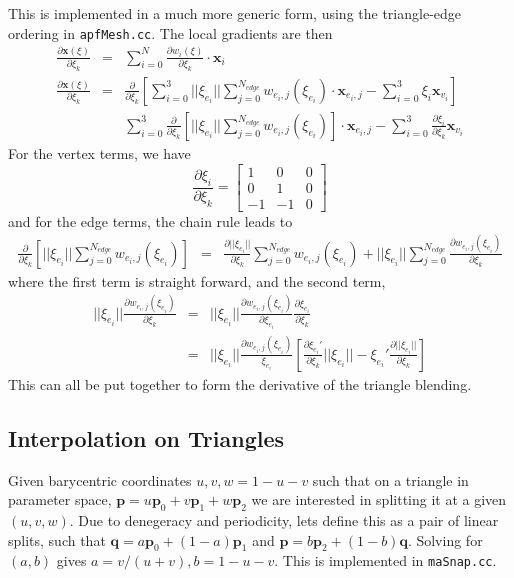 \documentclass{article}
\begin{document}
This is implemented in a much more generic form, using the triangle-edge ordering in \texttt{apfMesh.cc}. The local gradients are then
\begin{eqnarray*}\frac{\partial \mathbf{x}(\xi)}{\partial \xi_k}& = & \sum_{i=0}^N \frac{\partial w_i(\xi)}{\partial \xi_k} \cdot \mathbf{x}_i \\
\frac{\partial \mathbf{x}(\xi)}{\partial \xi_k}& = & \frac{\partial}{\partial \xi_k}\left[\sum_{i=0}^{3}||\xi_{e_i}||\sum_{j=0}^{N_{edge}}w_{e_i,j}(\xi_{e_i})\cdot\mathbf{x}_{e_i,j}- \sum_{i=0}^{3}\xi_i\mathbf{x}_{v_i}\right] \\ & & 
\sum_{i=0}^{3}\frac{\partial}{\partial \xi_k}\left[||\xi_{e_i}||\sum_{j=0}^{N_{edge}}w_{e_i,j}(\xi_{e_i})\right]\cdot\mathbf{x}_{e_i,j}- \sum_{i=0}^{3} \frac{\partial \xi_i}{\partial \xi_k}\mathbf{x}_{v_i}\end{eqnarray*}
For the vertex terms, we have
\[ \frac{\partial \xi_i}{\partial \xi_k} = \left[ \begin{array}{ccc} 1 & 0 & 0 \\ 0 & 1 & 0 \\ -1 & -1 & 0 \end{array}\right]\]
and for the edge terms, the chain rule leads to
\begin{eqnarray*}\frac{\partial}{\partial \xi_k}\left[||\xi_{e_i}||\sum_{j=0}^{N_{edge}}w_{e_i,j}(\xi_{e_i})\right] & = & \frac{\partial ||\xi_{e_i}||}{\partial \xi_k}\sum_{j=0}^{N_{edge}}w_{e_i,j}(\xi_{e_i}) + ||\xi_{e_i}||\sum_{j=0}^{N_{edge}}\frac{\partial w_{e_i,j}(\xi_{e_i})}{\partial \xi_k}

\end{eqnarray*}
where the first term is straight forward, and the second term, 
\begin{eqnarray*}
||\xi_{e_i}||\frac{\partial w_{e_i,j}(\xi_{e_i})}{\partial \xi_k} & = & 
||\xi_{e_i}||\frac{\partial w_{e_i,j}(\xi_{e_i})}{\partial \xi_{e_i}}\frac{\partial \xi_{e_i}}{\partial \xi_k} \\ & = & 
||\xi_{e_i}||\frac{\partial w_{e_i,j}(\xi_{e_i})}{\xi_{e_i}}\left[\frac{\partial \xi_{e_i}'}{\partial \xi_k}||\xi_{e_i}||-\xi_{e_i}'\frac{\partial ||\xi_{e_i}||}{\partial \xi_k} \right]

\end{eqnarray*}
This can all be put together to form the derivative of the triangle blending.



\subsection{Interpolation on Triangles}
Given barycentric coordinates $u,v,w=1-u-v$ such that on a triangle in parameter space, $\mathbf{p} = u\mathbf{p}_0 + v\mathbf{p}_1 + w\mathbf{p}_2$ we are interested in splitting it at a given $(u,v,w)$. Due to denegeracy and periodicity, lets define this as a pair of linear splits, such that $ \mathbf{q} = a\mathbf{p}_0 + (1-a)\mathbf{p}_1 $ and $\mathbf{p} = b\mathbf{p}_2 + (1-b)\mathbf{q}$. Solving for $(a,b)$ gives $ a = v/(u+v), b = 1-u-v$. This is implemented in \texttt{maSnap.cc}.
\end{document}
